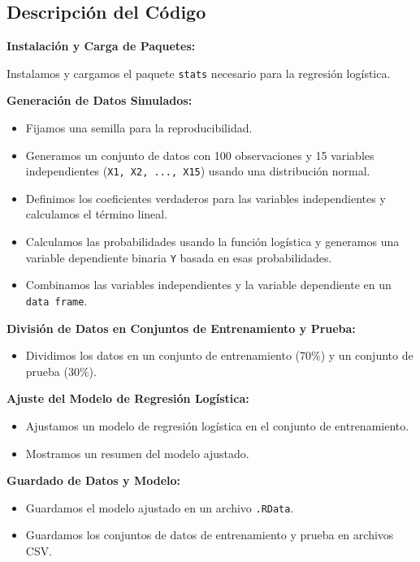 \subsection*{Descripción del Código}

\textbf{Instalación y Carga de Paquetes:}

Instalamos y cargamos el paquete \texttt{stats} necesario para la regresión logística.

\textbf{Generación de Datos Simulados:}

\begin{itemize}
    \item Fijamos una semilla para la reproducibilidad.
    \item Generamos un conjunto de datos con 100 observaciones y 15 variables independientes (\texttt{X1, X2, ..., X15}) usando una distribución normal.
    \item Definimos los coeficientes verdaderos para las variables independientes y calculamos el término lineal.
    \item Calculamos las probabilidades usando la función logística y generamos una variable dependiente binaria \texttt{Y} basada en esas probabilidades.
    \item Combinamos las variables independientes y la variable dependiente en un \texttt{data frame}.
\end{itemize}

\textbf{División de Datos en Conjuntos de Entrenamiento y Prueba:}

\begin{itemize}
    \item Dividimos los datos en un conjunto de entrenamiento (70\%) y un conjunto de prueba (30\%).
\end{itemize}

\textbf{Ajuste del Modelo de Regresión Logística:}

\begin{itemize}
    \item Ajustamos un modelo de regresión logística en el conjunto de entrenamiento.
    \item Mostramos un resumen del modelo ajustado.
\end{itemize}

\textbf{Guardado de Datos y Modelo:}

\begin{itemize}
    \item Guardamos el modelo ajustado en un archivo \texttt{.RData}.
    \item Guardamos los conjuntos de datos de entrenamiento y prueba en archivos CSV.
\end{itemize}


